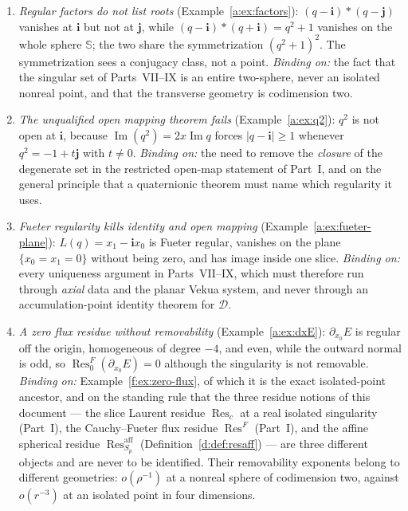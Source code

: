 \documentclass[11pt,a4paper]{article}
\numberwithin{equation}{section}
\theoremstyle{definition}
\theoremstyle{remark}
\theoremstyle{plain}
\newcommand{\SSS}{\mathbb S}
\DeclareMathOperator{\Ima}{Im}
\newcommand{\Dop}{\mathcal D}
\newcommand{\Sp}{S_{p}}
\newcommand{\abs}[1]{\lvert #1\rvert}
\newcommand{\Res}{\operatorname{Res}}
\newcommand{\Resaff}{\operatorname{Res}^{\mathrm{aff}}}
\begin{document}
\begin{enumerate}[label=\textup{(\alph*)}]
\item \emph{Regular factors do not list roots}
(Example~\ref{a:ex:factors}): $(q-\mathbf i)*(q-\mathbf j)$ vanishes at
$\mathbf i$ but not at $\mathbf j$, while $(q-\mathbf i)*(q+\mathbf i)
=q^2+1$ vanishes on the whole sphere $\SSS$; the two share the
symmetrization $(q^2+1)^2$. The symmetrization sees a conjugacy class, not
a point. \emph{Binding on:} the fact that the singular set of Parts~VII--IX
is an entire two-sphere, never an isolated nonreal point, and that the
transverse geometry is codimension two.
\item \emph{The unqualified open mapping theorem fails}
(Example~\ref{a:ex:q2}): $q^2$ is not open at $\mathbf i$, because
$\Ima(q^2)=2x\Ima q$ forces $\abs{q-\mathbf i}\ge1$ whenever
$q^2=-1+t\mathbf j$ with $t\ne0$. \emph{Binding on:} the need to remove the
\emph{closure} of the degenerate set in the restricted open-map statement
of Part~I, and on the general principle that a quaternionic theorem must
name which regularity it uses.
\item \emph{Fueter regularity kills identity and open mapping}
(Example~\ref{a:ex:fueter-plane}): $L(q)=x_1-\mathbf i x_0$ is Fueter
regular, vanishes on the plane $\{x_0=x_1=0\}$ without being zero, and has
image inside one slice. \emph{Binding on:} every uniqueness argument in
Parts~VII--IX, which must therefore run through \emph{axial} data and the
planar Vekua system, and never through an accumulation-point identity
theorem for $\Dop$.
\item \emph{A zero flux residue without removability}
(Example~\ref{a:ex:dxE}): $\partial_{x_0}E$ is regular off the origin,
homogeneous of degree $-4$, and even, while the outward normal is odd, so
$\Res^F_0(\partial_{x_0}E)=0$ although the singularity is not removable.
\emph{Binding on:} Example~\ref{f:ex:zero-flux}, of which it is the exact
isolated-point ancestor, and on the standing rule that the three residue
notions of this document --- the slice Laurent residue $\Res_c$ at a real
isolated singularity (Part~I), the Cauchy--Fueter flux residue $\Res^F$
(Part~I), and the affine spherical residue $\Resaff_{\Sp}$
(Definition~\ref{d:def:resaff}) --- are three different objects and are
never to be identified. Their removability exponents belong to different
geometries: $o(\rho^{-1})$ at a nonreal sphere of codimension two, against
$o(r^{-3})$ at an isolated point in four dimensions.
\end{enumerate}
\end{document}
